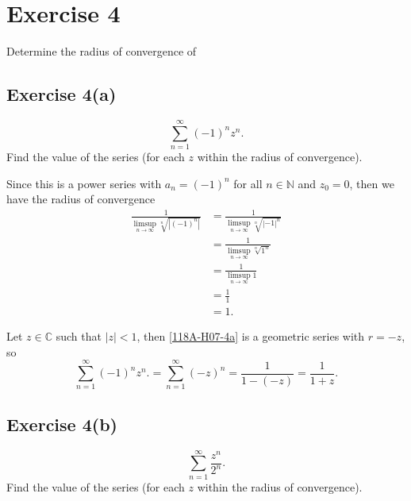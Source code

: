 \documentclass[12pt]{article}
\newenvironment{problem}
    {\begin{lrbox}{\mybox}\begin{minipage}{0.98\textwidth}}
    {\end{minipage}\end{lrbox}\framebox[\textwidth]{\usebox{\mybox}}}
\newcommand{\ds}{\displaystyle}
\newcommand{\N}{\mathbb{N}} %
\newcommand{\C}{\mathbb{C}} %
\newcommand{\<}{\left\langle} %
\renewcommand{\>}{\right\rangle} %
\begin{document}
\newpage
\section*{Exercise 4}
\begin{problem}
    Determine the radius of convergence of 
\end{problem}

\subsection*{Exercise 4(a)}
\begin{problem}
    \begin{equation}\label{118A-H07-4a}
        \sum_{n=1}^\infty (-1)^n z^n.
    \end{equation}
    Find the value of the series (for each $z$ within the radius of convergence).
\end{problem}
\medskip

Since this is a power series with $a_n = (-1)^n$ for all $n\in\N$ and $z_0 = 0$, then we have the radius of convergence
\begin{align*}
    \frac1{\ds\limsup_{n\to\infty}\sqrt[n]{|(-1)^n|}}
        &= \frac1{\ds\limsup_{n\to\infty}\sqrt[n]{|-1|^n}} \\
        &= \frac1{\ds\limsup_{n\to\infty}\sqrt[n]{1^n}} \\
        &= \frac1{\ds\limsup_{n\to\infty}1} \\
        &= \frac11 \\
        &= 1.
\end{align*}

Let $z\in\C$ such that $|z|<1$, then \eqref{118A-H07-4a} is a geometric series with $r=-z$, so
\[\sum_{n=1}^\infty (-1)^n z^n. = \sum_{n=1}^\infty (-z)^n = \frac1{1-(-z)} = \frac1{1+z}.\]

\newpage
\subsection*{Exercise 4(b)}
\begin{problem}
    \begin{equation}\label{118A-H07-4b}
        \sum_{n=1}^\infty  \frac{z^n}{2^n}.
    \end{equation}
    Find the value of the series (for each $z$ within the radius of convergence).
\end{problem}
\medskip
\end{document}

